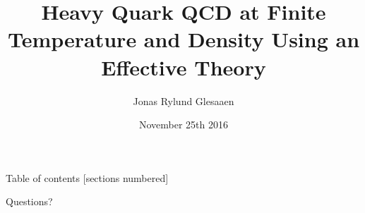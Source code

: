 \documentclass[11pt]{beamer}
\author{Jonas Rylund Glesaaen}
\title{Heavy Quark QCD at Finite Temperature and Density Using an Effective Theory}
\institute{Goethe University Frankfurt}
\date{November 25th 2016}
\begin{document}
\maketitle

\begin{frame}{Table of contents}
  [sections numbered]
  \tableofcontents[hideallsubsections]
\end{frame}






\begin{frame}[standout]
  Questions?
\end{frame}


\end{document}
